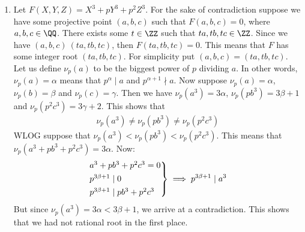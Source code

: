 \begin{enumerate}[label=]
    \item
        Let $F(X, Y, Z) = X^3 + pY^3 + p^2 Z^3$. For the sake of contradiction suppose we have some projective point $(a, b, c)$ such that $F(a, b, c) = 0$, where $a, b, c \in \QQ$. There exists some $t \in \ZZ$ such that $ta, tb, tc \in \ZZ$. Since we have $(a, b, c) ~ (ta, tb, tc)$, then $F(ta, tb, tc) = 0$. This means that $F$ has some integer root $(ta, tb, tc)$. For simplicity put $(a, b, c) = (ta, tb, tc)$. Let us define $\nu_p(a)$ to be the biggest power of $p$ dividing $a$. In other words, $\nu_p(a) = \alpha$ means that $p^\alpha \mid a$ and $p^{\alpha + 1} \nmid a$. Now suppose $\nu_p(a) = \alpha$, $\nu_p(b) = \beta$ and $\nu_p(c) = \gamma$. Then we have $\nu_p(a^3) = 3\alpha$, $\nu_p(pb^3) = 3 \beta + 1$ and $\nu_p(p^2 c^3) = 3 \gamma + 2$. This shows that 
        \begin{gather*}
            \nu_p(a^3) \ne \nu_p(pb^3) \ne \nu_p(p^2 c^3)
        \end{gather*}
        WLOG suppose that $\nu_p(a^3) < \nu_p(pb^3) < \nu_p(p^2c^3)$. This means that $\nu_p(a^3 + pb^3 + p^2 c^3) = 3 \alpha$. Now:
        \begin{gather*}
            \begin{rcases}
                a^3 + pb^3 + p^2 c^3 = 0 \\
                p^{3 \beta + 1} \mid 0 \\
                p^{3 \beta + 1} \mid p b^3 + p^2 c^3 
            \end{rcases}
            \implies p^{3 \beta + 1} \mid a^3
        \end{gather*}
        But since $\nu_p(a^3) = 3 \alpha < 3 \beta + 1$, we arrive at a contradiction. This shows that we had not rational root in the first place.
\end{enumerate}